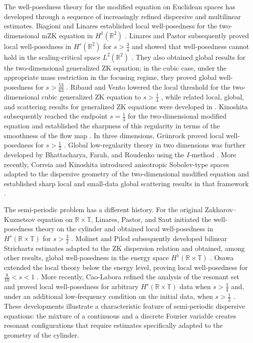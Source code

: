 \documentclass[12pt,oneside,reqno]{amsart}
\numberwithin{equation}{section}
\theoremstyle{plain}
\def\R{{\mathbb R}}
\def\T{{\mathbb T}}
\begin{document}
The well-posedness theory for the modified equation on Euclidean spaces has
developed through a sequence of increasingly refined dispersive and
multilinear estimates. Biagioni and Linares established local well-posedness
for the two-dimensional mZK equation in $H^1(\R^2)$
\cite{biagioni2003well}. Linares and Pastor subsequently proved local
well-posedness in $H^s(\R^2)$ for $s>\frac34$ and showed that well-posedness
cannot hold in the scaling-critical space $L^2(\R^2)$
\cite{linares2009well}. They also obtained global results for the
two-dimensional generalized ZK equation; in the cubic case, under the
appropriate mass restriction in the focusing regime, they proved global
well-posedness for $s>\frac{53}{63}$
\cite{linares2011local}. Ribaud and Vento lowered the local threshold for
the two-dimensional cubic generalized ZK equation to
$s>\frac14$ \cite{ribaud2012note}, while related local, global, and
scattering results for generalized ZK equations were developed in
\cite{farah2012note}. Kinoshita subsequently reached the endpoint
$s=\frac14$ for the two-dimensional modified equation and established the
sharpness of this regularity in terms of the smoothness of the flow map
\cite{kinoshita2022well}. In three dimensions, Gr\"unrock proved local
well-posedness for $s>\frac12$ \cite{grunrock2014remark}. Global
low-regularity theory in two dimensions was
further developed by Bhattacharya, Farah, and Roudenko using the $I$-method
\cite{bhattacharya2020global}. More recently, Correia and Kinoshita introduced
anisotropic Sobolev-type spaces adapted to the dispersive geometry of the
two-dimensional modified equation and established sharp local and small-data
global scattering results in that framework
\cite{correia2026global}.

The semi-periodic problem has a different history. For the original
Zakharov--Kuznetsov equation on $\R\times\T$, Linares, Pastor, and Saut
initiated the well-posedness theory on the cylinder and obtained local
well-posedness in $H^s(\R\times\T)$ for $s>\frac32$
\cite{linares2010well}. Molinet and Pilod subsequently developed bilinear
Strichartz estimates adapted to the ZK dispersion relation and obtained,
among other results, global well-posedness in the energy space
$H^1(\R\times\T)$ \cite{molinet2015bilinear}. Osawa extended the local
theory below the energy level, proving local well-posedness for
$\frac{9}{10}<s<1$ \cite{osawa2022local}. More recently, Cao-Labora refined
the analysis of the resonant set and proved local well-posedness for arbitrary
$H^s(\R\times\T)$ data when $s>\frac34$ and, under an additional
low-frequency condition on the initial data, when $s>\frac12$
\cite{cao2025low}. These developments illustrate a characteristic feature of
semi-periodic dispersive equations: the mixture of a continuous and a
discrete Fourier variable creates resonant configurations that require
estimates specifically adapted to the geometry of the cylinder.
\end{document}

